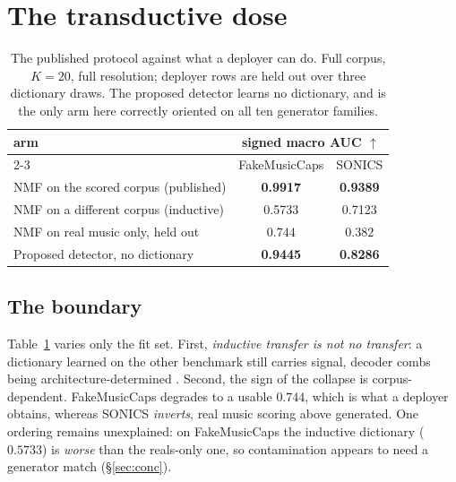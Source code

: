 \documentclass{article}
\begin{document}
\section{The transductive dose}
\label{sec:boundary}

\begin{table}[t]
\centering
\caption{The published protocol against what a deployer can do. Full corpus,
$K{=}20$, full resolution; deployer rows are held out over three dictionary draws.
The proposed detector learns no dictionary, and is the only arm here correctly
oriented on all ten generator families.}
\label{tab:boundary}
{\footnotesize
\begin{tabular}{@{}lcc@{}}
\toprule
arm & \multicolumn{2}{c}{signed macro AUC $\uparrow$} \\
\cmidrule(l){2-3}
 & FakeMusicCaps & SONICS \\
\midrule
NMF on the scored corpus (published) & \textbf{0.9917} & \textbf{0.9389} \\
NMF on a different corpus (inductive) & 0.5733 & 0.7123 \\
NMF on real music only, held out & $0.744$ & $0.382$ \\
\midrule
Proposed detector, no dictionary & \textbf{0.9445} & \textbf{0.8286} \\
\bottomrule
\end{tabular}}
\end{table}

\subsection{The boundary}
\label{ssec:boundary}
Table~\ref{tab:boundary} varies only the fit set. First, \emph{inductive transfer
is not no transfer}: a dictionary learned on the other benchmark still carries
signal, decoder combs being architecture-determined \cite{pons2021upsampling}. Second, the sign of the collapse is corpus-dependent.
FakeMusicCaps degrades to a usable $0.744$, which is what a deployer obtains,
whereas SONICS \emph{inverts}, real music scoring above generated. One ordering
remains unexplained: on FakeMusicCaps the
inductive dictionary ($0.5733$) is \emph{worse} than the reals-only one, so
contamination appears to need a generator match
(\S\ref{sec:conc}).
\end{document}
